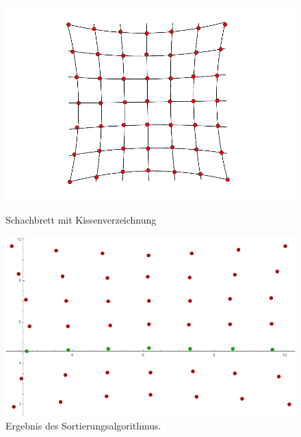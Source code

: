 \begin{figure}[!htb]
	\includegraphics[width=\linewidth]{images/KissenVerzeichnung.png}
	\caption[Schachbrett mit Kissenverzeichnung]{Schachbrett mit Kissenverzeichnung}
	\label{fig:Extreme5}
	\endminipage\hfill
	\includegraphics[width=\linewidth]{images/AlgKissen.png}
	\caption[Sortierte Punkte eines Schachbretts mit Kissenverzeichnung ]{Ergebnis des Sortierungsalgorithmus.}
	\label{fig:Extreme6}
	\endminipage\hfill
\end{figure}

